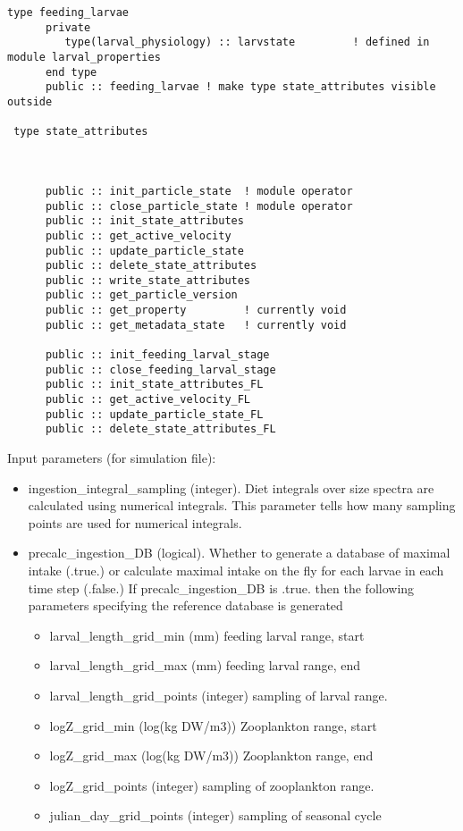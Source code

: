 \begin{verbatim}
type feeding_larvae
      private
         type(larval_physiology) :: larvstate         ! defined in module larval_properties 
      end type
      public :: feeding_larvae ! make type state_attributes visible outside

 type state_attributes



      public :: init_particle_state  ! module operator
      public :: close_particle_state ! module operator
      public :: init_state_attributes
      public :: get_active_velocity
      public :: update_particle_state
      public :: delete_state_attributes 
      public :: write_state_attributes
      public :: get_particle_version
      public :: get_property         ! currently void
      public :: get_metadata_state   ! currently void

      public :: init_feeding_larval_stage
      public :: close_feeding_larval_stage
      public :: init_state_attributes_FL
      public :: get_active_velocity_FL
      public :: update_particle_state_FL
      public :: delete_state_attributes_FL
\end{verbatim}

Input parameters (for simulation file):\newline
\begin{itemize}
  \item ingestion\_integral\_sampling (integer). Diet integrals over
        size spectra are calculated using numerical integrals. This parameter
        tells how many sampling points are used for numerical integrals.  
  \item precalc\_ingestion\_DB (logical). Whether to generate a database of
        maximal intake (.true.) or calculate  maximal intake on the fly for each larvae in 
        each time step (.false.)
        If precalc\_ingestion\_DB is .true. then the following parameters
        specifying the reference database is generated
        \begin{itemize}
          \item larval\_length\_grid\_min (mm) feeding larval range, start
          \item larval\_length\_grid\_max (mm) feeding larval range, end
          \item larval\_length\_grid\_points (integer) sampling of larval range.
          \item logZ\_grid\_min (log(kg DW/m3)) Zooplankton range, start
          \item logZ\_grid\_max (log(kg DW/m3)) Zooplankton range, end
          \item logZ\_grid\_points (integer) sampling of zooplankton range.
          \item julian\_day\_grid\_points (integer) sampling of seasonal cycle
  \end{itemize}
\end{itemize}

